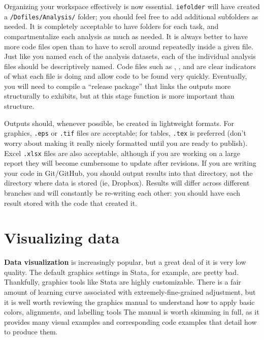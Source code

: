 Organizing your workspace effectively is now essential.
\texttt{iefolder} will have created a \texttt{/Dofiles/Analysis/} folder;
you should feel free to add additional subfolders as needed.
It is completely acceptable to have folders for each task,
and compartmentalize each analysis as much as needed.
It is always better to have more code files open
than to have to scroll around repeatedly inside a given file.
Just like you named each of the analysis datasets,
each of the individual analysis files should be descriptively named.
Code files such as ,
, and 
are clear indicators of what each file is doing
and allow code to be found very quickly.
Eventually, you will need to compile a ``release package''
that links the outputs more structurally to exhibits,
but at this stage function is more important than structure.

Outputs should, whenever possible, be created in lightweight formats.
For graphics, \texttt{.eps} or \texttt{.tif} files are acceptable;
for tables, \texttt{.tex} is preferred (don't worry about making it
really nicely formatted until you are ready to publish).
Excel \texttt{.xlsx} files are also acceptable,
although if you are working on a large report
they will become cumbersome to update after revisions.
If you are writing your code in Git/GitHub,
you should output results into that directory,
not the directory where data is stored (ie, Dropbox).
Results will differ across different branches
and will constantly be re-writing each other:
you should have each result stored with the code that created it.


\section{Visualizing data}

\textbf{Data visualization} is increasingly popular,
but a great deal of it is very low quality.\cite{healy2018data,wilke2019fundamentals}
The default graphics settings in Stata, for example,
are pretty bad.
Thankfully, graphics tools like Stata are highly customizable.
There is a fair amount of learning curve associated with
extremely-fine-grained adjustment,
but it is well worth reviewing the graphics manual
to understand how to apply basic colors, alignments, and labelling tools
The manual is worth skimming in full, as it provides
many visual examples and corresponding code examples
that detail how to produce them.

